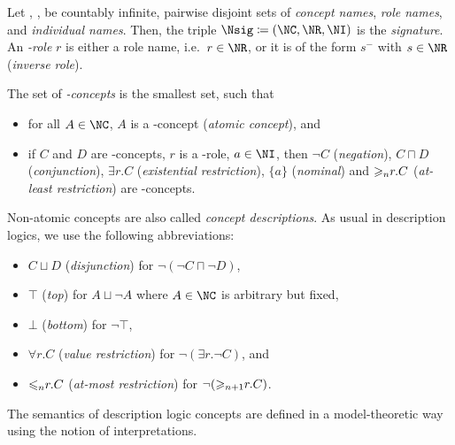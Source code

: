 \begin{definition}
  \label{def:syntax-concepts}
  Let \NC, \NR, \NI be countably infinite, pairwise disjoint sets of \emph{concept names}, \emph{role names},
  and \emph{individual names}. Then, the triple $\Nsig\coloneqq(\NC,\NR,\NI)$ is the
  \emph{signature}. An \emph{\Nsig-role} $r$ is either a role name, i.e.~$r\in\NR$, or it is of the
  form $s^{-}$ with $s\in\NR$ (\emph{inverse role}).

  The set of \emph{\Nsig-concepts} is the smallest set, such that
  \begin{itemize}
  \item for all $A\in\NC$, $A$ is a \Nsig-concept (\emph{atomic concept}), and
  \item if $C$ and $D$ are \Nsig-concepts, $r$ is a \Nsig-role, $a\in\NI$, then $\lnot C$ (\emph{negation}),
    $C\sqcap D$ (\emph{conjunction}), $\exists r.C$ (\emph{existential restriction}), $\{a\}$
    (\emph{nominal}) and ${\geqslant_{n}}r.C$ (\emph{at-least restriction}) are \Nsig-concepts. \qedhere
  \end{itemize}
\end{definition}

\noindent Non-atomic concepts are also called \emph{concept descriptions}. As usual in description
logics, we use the following abbreviations:
\begin{itemize}
\item $C\sqcup D$ (\emph{disjunction}) for $\lnot(\lnot C \sqcap \lnot D)$,
\item $\top$ (\emph{top}) for $A \sqcup \lnot A$ where $A\in\NC$ is arbitrary but fixed,
\item $\bot$ (\emph{bottom}) for $\lnot\top$,
\item $\forall r.C$ (\emph{value restriction}) for $\lnot(\exists r.\lnot C)$, and
\item ${\leqslant_{n}}r.C$ (\emph{at-most restriction}) for $\lnot({\geqslant_{n+1}}r.C)$.
\end{itemize}


The semantics of description logic concepts are defined in a model-theoretic way using the notion of
interpretations.

